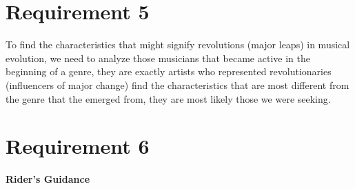 \documentclass[12pt]{article}
\begin{document}
\section{Requirement 5}
To find the characteristics that might signify revolutions (major leaps) in musical evolution, we need to analyze those musicians that became active in the beginning of
a genre, they are exactly artists who represented revolutionaries (influencers of major
change) find the characteristics that are most different from the genre that the emerged from, they are most likely those we were seeking.
\newpage
\section{Requirement 6}
\begin{center}
    \huge \textbf{Rider's Guidance}
\end{center}



\end{document}
